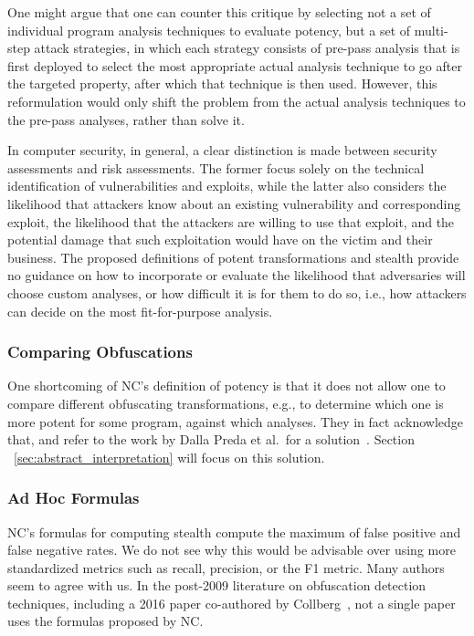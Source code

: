 One might argue that one can counter this critique by selecting not a set of individual program analysis techniques to evaluate potency, but a set of multi-step attack strategies, in which each strategy consists of pre-pass analysis that is first deployed to select the most appropriate actual analysis technique to go after the targeted property, after which that technique is then used. However, this reformulation would only shift the problem from the actual analysis techniques to the pre-pass analyses, rather than solve it.

In computer security, in general, a clear distinction is made between security assessments and risk assessments. The former focus solely on the technical identification of vulnerabilities and exploits, while the latter also considers the likelihood that attackers know about an existing vulnerability and corresponding exploit, the likelihood that the attackers are willing to use that exploit, and the potential damage that such exploitation would have on the victim and their business. The proposed definitions of potent transformations and stealth provide no guidance on how to incorporate or evaluate the likelihood that adversaries will choose custom analyses, or how difficult it is for them to do so, i.e., how attackers can decide on the most fit-for-purpose analysis.

\subsubsection{Comparing Obfuscations}
One shortcoming of NC's definition of potency is that it does not allow one to compare different obfuscating transformations, e.g., to determine which one is more potent for some program, against which analyses. They in fact acknowledge that, and refer to the work by Dalla Preda et al.\ for a solution~\cite{mila07}. Section ~\ref{sec:abstract_interpretation} will focus on this solution.

\subsubsection{Ad Hoc Formulas}
NC's formulas for computing stealth compute the maximum of false positive and false negative rates. We do not see why this would be advisable over using more standardized metrics such as recall, precision, or the F1 metric. Many authors seem to agree with us. In the post-2009 literature on obfuscation detection techniques, including a 2016 paper co-authored by Collberg~\cite{code_artificiality}, not a single paper uses the formulas proposed by NC. %

